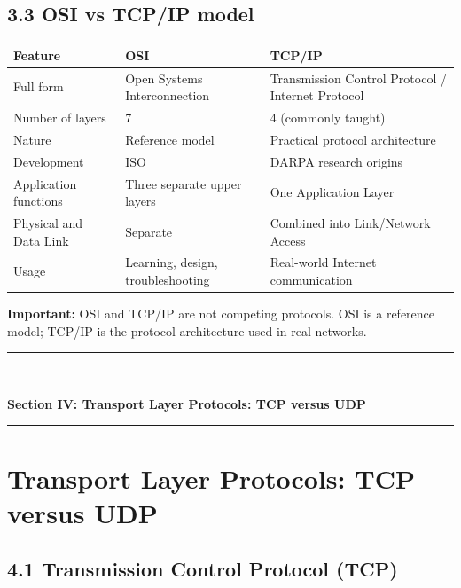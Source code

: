 \subsection{3.3 OSI vs TCP/IP model}

\begin{table}[htbp]
\centering
\begin{tabularx}{\textwidth}{p{4.2cm} X X}
\toprule
\textbf{Feature} & \textbf{OSI} & \textbf{TCP/IP} \\
\midrule
Full form & Open Systems Interconnection & Transmission Control Protocol / Internet Protocol \\
Number of layers & 7 & 4 (commonly taught) \\
Nature & Reference model & Practical protocol architecture \\
Development & ISO & DARPA research origins \\
Application functions & Three separate upper layers & One Application Layer \\
Physical and Data Link & Separate & Combined into Link/Network Access \\
Usage & Learning, design, troubleshooting & Real-world Internet communication \\
\bottomrule
\end{tabularx}
\end{table}

\textbf{Important:} OSI and TCP/IP are not competing protocols. OSI is a reference model; TCP/IP is the protocol architecture used in real networks.


\newpage

\newpage
\begin{center}
\vspace{0.5em}
{\color{primary}\rule{0.45\textwidth}{1.2pt}\\[4pt]}
{\Large\bfseries\color{primary} Section IV: Transport Layer Protocols: TCP versus UDP\\[2pt]}
{\color{primary}\rule{0.45\textwidth}{1.2pt}}
\vspace{0.5em}
\end{center}

\section{Transport Layer Protocols: TCP versus UDP}

\subsection{4.1 Transmission Control Protocol (TCP)}

